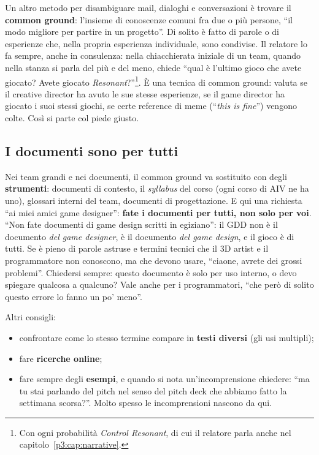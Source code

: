 Un altro metodo per disambiguare mail, dialoghi e conversazioni è trovare il
\textbf{common ground}: l'insieme di conoscenze comuni fra due o più persone,
``il modo migliore per partire in un progetto''. Di solito è fatto di parole o
di esperienze che, nella propria esperienza individuale, sono condivise. Il
relatore lo fa sempre, anche in consulenza: nella chiacchierata iniziale di un
team, quando nella stanza si parla del più e del meno, chiede ``qual è l'ultimo
gioco che avete giocato? Avete giocato \emph{Resonant}?''\footnote{Con ogni
probabilità \emph{Control Resonant}, di cui il relatore parla anche nel
capitolo~\ref{p3:cap:narrative}.}. È una tecnica di common ground: valuta se il
creative director ha avuto le sue stesse esperienze, se il game director ha
giocato i suoi stessi giochi, se certe reference di meme (``\emph{this is
fine}'') vengono colte. Così si parte col piede giusto.

\subsection{I documenti sono per tutti}

Nei team grandi e nei documenti, il common ground va sostituito con degli
\textbf{strumenti}: documenti di contesto, il \emph{syllabus} del corso (ogni
corso di AIV ne ha uno), glossari interni del team, documenti di progettazione.
E qui una richiesta ``ai miei amici game designer'': \textbf{fate i documenti
per tutti, non solo per voi}. ``Non fate documenti di game design scritti in
egiziano'': il GDD non è il documento \emph{del game designer}, è il documento
\emph{del game design}, e il gioco è di tutti. Se è pieno di parole astruse e
termini tecnici che il 3D artist e il programmatore non conoscono, ma che
devono usare, ``ciaone, avrete dei grossi problemi''. Chiedersi sempre: questo
documento è solo per uso interno, o devo spiegare qualcosa a qualcuno? Vale
anche per i programmatori, ``che però di solito questo errore lo fanno un po'
meno''.

Altri consigli:
\begin{itemize}
  \item confrontare come lo stesso termine compare in \textbf{testi diversi}
        (gli usi multipli);
  \item fare \textbf{ricerche online};
  \item fare sempre degli \textbf{esempi}, e quando si nota un'incomprensione
        chiedere: ``ma tu stai parlando del pitch nel senso del pitch deck che
        abbiamo fatto la settimana scorsa?''. Molto spesso le incomprensioni
        nascono da qui.
\end{itemize}

